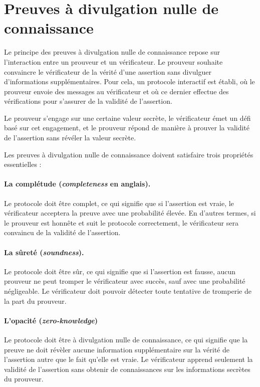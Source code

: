 
\section{Preuves à divulgation nulle de connaissance} %
\label{sec:preuves}
Le principe des preuves à divulgation nulle de connaissance repose sur l'interaction entre un
prouveur et un vérificateur.
Le prouveur souhaite convaincre le vérificateur de la vérité d'une assertion sans divulguer
d'informations supplémentaires.
Pour cela, un protocole interactif est établi, où le prouveur envoie des messages au vérificateur et
où ce dernier effectue des vérifications pour s'assurer de la validité de l'assertion.

Le prouveur s'engage sur une certaine valeur secrète, le vérificateur émet un défi basé sur cet
engagement, et le prouveur répond de manière à prouver la validité de l'assertion sans révéler la
valeur secrète.

Les preuves à divulgation nulle de connaissance doivent satisfaire trois propriétés essentielles :

\paragraph{La complétude (\emph{completeness} en anglais).}

Le protocole doit être complet, ce qui signifie que si l'assertion est vraie, le vérificateur
acceptera la preuve avec une probabilité élevée.
En d'autres termes, si le prouveur est honnête et suit le protocole correctement, le vérificateur
sera convaincu de la validité de l'assertion.

\paragraph{La sûreté (\emph{soundness}).}

Le protocole doit être sûr, ce qui signifie que si l'assertion est fausse, aucun prouveur ne peut
tromper le vérificateur avec succès, sauf avec une probabilité négligeable.
Le vérificateur doit pouvoir détecter toute tentative de tromperie de la part du prouveur.

\paragraph{L’opacité (\emph{zero-knowledge})}

Le protocole doit être à divulgation nulle de connaissance, ce qui signifie que la preuve ne doit
révèler aucune information supplémentaire sur la vérité de l'assertion autre que le fait qu'elle est
vraie.
Le vérificateur apprend seulement la validité de l'assertion sans obtenir de connaissances sur les
informations secrètes du prouveur.

